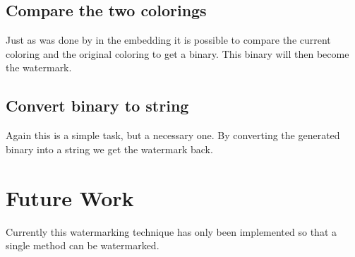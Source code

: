 \subsection{Compare the two colorings}
Just as was done by in the embedding it is possible to compare the current 
coloring and the original coloring to get a binary. This binary will then 
become the watermark.


\subsection{Convert binary to string}
Again this is a simple task, but a necessary one. By converting the 
generated binary into a string we get the watermark back.

\section{Future Work}
Currently this watermarking technique has only been implemented so that a single method can be watermarked.

